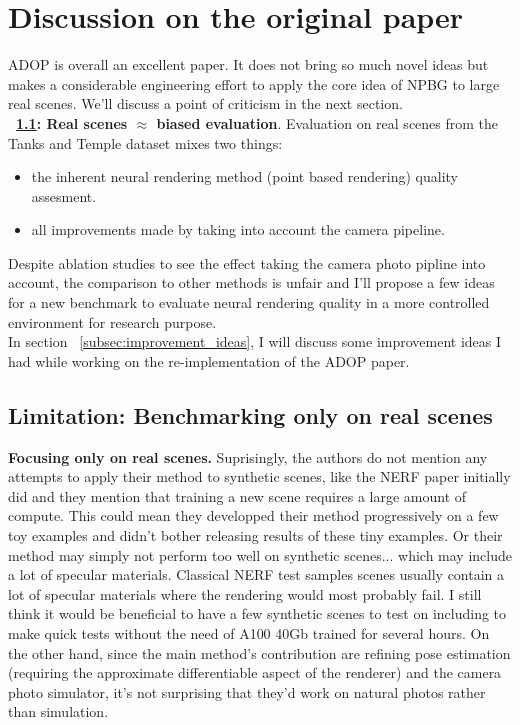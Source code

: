 \section{Discussion on the original paper}
\label{sec:discussion}
ADOP\cite{Aruckert2022adop} is overall an excellent paper. It does not bring so much novel ideas but makes a considerable engineering effort to apply the core idea of NPBG \cite{Aliev2020} to large real scenes.
We'll discuss a point of criticism in the next section.\\
\noindent \textbf{~\ref{subsec:limits_real_scenes}{: Real scenes $\approx$ biased evaluation}}. Evaluation on real scenes from the Tanks and Temple dataset \cite{Knapitsch2017TanksAndTemples} mixes two things:
\begin{itemize}
    \item the inherent neural rendering method (point based rendering) quality assesment.
    \item all improvements made by taking into account the camera pipeline.
\end{itemize}
Despite ablation studies to see the effect taking the camera photo pipline into account, the comparison to other methods is unfair and I'll propose a few ideas for a new benchmark to evaluate neural rendering quality in a more controlled environment for research purpose.\\
In section ~\ref{subsec:improvement_ideas}, I will discuss some improvement ideas I had while working on the re-implementation of the ADOP paper.



\subsection{Limitation: Benchmarking only on real scenes}
\label{subsec:limits_real_scenes}
\noindent \textbf{Focusing only on real scenes.}
Suprisingly, the authors do not mention any attempts to apply their method to synthetic scenes, like the NERF paper initially did and they mention that training a new scene requires a large amount of compute. This could mean they developped their method progressively on a few toy examples and didn't bother releasing results of these tiny examples. Or their method may simply not perform too well on synthetic scenes... which may include a lot of specular materials. Classical NERF test samples scenes usually contain a lot of specular materials where the rendering would most probably fail. I still think it would be beneficial to have a few synthetic scenes to test on including to make quick tests without the need of A100 40Gb trained for several hours.
On the other hand, since the main method's contribution are refining pose estimation (requiring the approximate differentiable aspect of the renderer) and the camera photo simulator, it's not surprising that they'd work on natural photos rather than simulation. 

